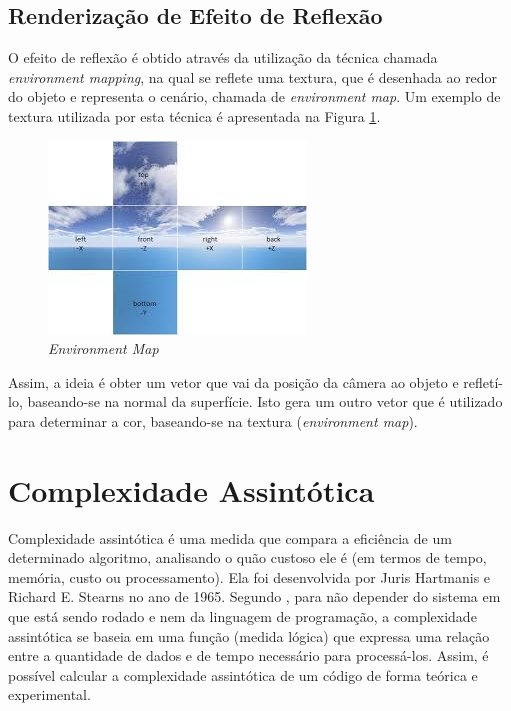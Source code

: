 {	\subsection{Renderização de Efeito de Reflexão}
	\label{ref_t}

	O efeito de reflexão é obtido através da utilização da técnica chamada \textit{environment mapping}, na qual se reflete uma textura, que é desenhada ao redor do objeto e representa o cenário, chamada de \textit{environment map}. Um exemplo de textura utilizada por esta técnica é apresentada na Figura \ref{environment}.

	\begin{figure}[ht]
	\centering
		\includegraphics[keepaspectratio=true,scale=1.0]{figuras/envmap.jpg}
	\caption{\textit{Environment Map}}
	\label{environment}
	\end{figure}

	Assim, a ideia é obter um vetor que vai da posição da câmera ao objeto e refletí-lo, baseando-se na normal da superfície. Isto gera um outro vetor que é utilizado para determinar a cor, baseando-se na textura (\textit{environment map}).

\section{Complexidade Assintótica}
\label{metminquad}

	Complexidade assintótica é uma medida que compara a eficiência de um determinado algoritmo, analisando o quão custoso ele é (em termos de tempo, memória, custo ou processamento). Ela foi desenvolvida por Juris Hartmanis e Richard E. Stearns no ano de 1965. Segundo \cite{complexidade}, para não depender do sistema em que está sendo rodado e nem da linguagem de programação, a complexidade assintótica se baseia em uma função (medida lógica) que expressa uma relação entre a quantidade de dados e de tempo necessário para processá-los. Assim, é possível calcular a complexidade assintótica de um código de forma teórica e experimental.

}
